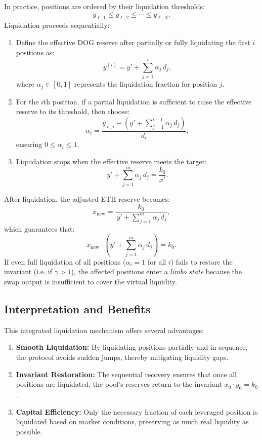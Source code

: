 \documentclass[11pt]{article}
\begin{document}
In practice, positions are ordered by their liquidation thresholds:
\[
y_{\ell,1} \le y_{\ell,2} \le \cdots \le y_{\ell,N}.
\]
Liquidation proceeds sequentially:
\begin{enumerate}
    \item Define the effective DOG reserve after partially or fully liquidating the first \(i\) positions as:
    \[
    y^{(i)} = y' + \sum_{j=1}^{i} \alpha_j\,d_j,
    \]
    where \(\alpha_j \in [0,1]\) represents the liquidation fraction for position \(j\).
    \item For the \(i\)th position, if a partial liquidation is sufficient to raise the effective reserve to its threshold, then choose:
    \[
    \alpha_i = \frac{y_{\ell,i} - \left(y' + \sum_{j=1}^{i-1} \alpha_j\,d_j \right)}{d_i},
    \]
    ensuring \(0\le \alpha_i \le 1\).
    \item Liquidation stops when the effective reserve meets the target:
    \[
    y' + \sum_{j=1}^{m} \alpha_j\,d_j = \frac{k_0}{x'}.
    \]
\end{enumerate}
After liquidation, the adjusted ETH reserve becomes:
\[
x_{\text{new}} = \frac{k_0}{\,y' + \sum_{j=1}^{m} \alpha_j\,d_j},
\]
which guarantees that:
\[
x_{\text{new}} \cdot \left(y' + \sum_{j=1}^{m} \alpha_j\,d_j\right) = k_0.
\]
If even full liquidation of all positions (\(\alpha_i=1\) for all \(i\)) fails to restore the invariant (i.e. if \(\gamma > 1\)), the affected positions enter a \emph{limbo state} because the swap output is insufficient to cover the virtual liquidity.

\subsection{Interpretation and Benefits}

This integrated liquidation mechanism offers several advantages:
\begin{enumerate}
    \item \textbf{Smooth Liquidation:} By liquidating positions partially and in sequence, the protocol avoids sudden jumps, thereby mitigating liquidity gaps.
    \item \textbf{Invariant Restoration:} The sequential recovery ensures that once all positions are liquidated, the pool's reserves return to the invariant \(x_0 \cdot y_0 = k_0\).
    \item \textbf{Capital Efficiency:} Only the necessary fraction of each leveraged position is liquidated based on market conditions, preserving as much real liquidity as possible.
\end{enumerate}
\end{document}
